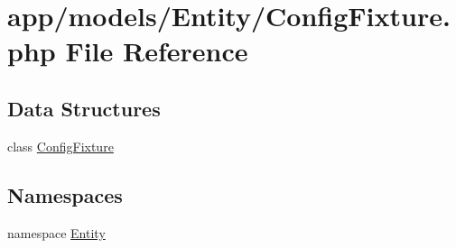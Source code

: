\hypertarget{_config_fixture_8php}{\section{app/models/\-Entity/\-Config\-Fixture.php File Reference}
\label{_config_fixture_8php}
}
\subsection*{Data Structures}
\begin{DoxyCompactItemize}
\item 
class \hyperlink{class_entity_1_1_config_fixture}{Config\-Fixture}
\end{DoxyCompactItemize}
\subsection*{Namespaces}
\begin{DoxyCompactItemize}
\item 
namespace \hyperlink{namespace_entity}{Entity}
\end{DoxyCompactItemize}

